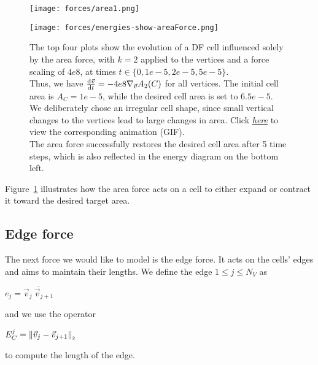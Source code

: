 \begin{figure}[htbp]
  \centering
  \texttt{[image: forces/area1.png]}\\[1ex]
  \begin{minipage}[c]{0.35\textwidth}
    \texttt{[image: forces/energies-show-areaForce.png]}
  \end{minipage}\hfill
  \begin{minipage}[c]{0.6\textwidth}
    \caption{
		The top four plots show the evolution of a DF cell influenced solely by the area force, with $k=2$ applied to the vertices and a force scaling of $4e8$, at times $t \in \{0, 1e-5, 2e-5, 5e-5\}$.\\
		Thus, we have $\frac{\mathrm{d} \vec{v}}{\mathrm{d} t} = - 4e8 \nabla_{\vec{v}} A_2(C)$ for all vertices.
		The initial cell area is $A_C = 1e-5$, while the desired cell area is set to $6.5e-5$.\\
		We deliberately chose an irregular cell shape, since small vertical changes to the vertices lead to large changes in area.
		Click \href{https://github.com/tivo476c/FlexibleCellModel/blob/master/figures/gifs/showForces/show-areaForce.gif}{\textit{here}} to view the corresponding animation (GIF).\\
		The area force successfully restores the desired cell area after 5 time steps, which is also reflected in the energy diagram on the bottom left.
    } 
	\label{fig:areaForce}
  \end{minipage}
\end{figure}


Figure~\ref{fig:areaForce} illustrates how the area force acts on a cell to either expand or contract it toward the desired target area.

    
\subsection{Edge force}
The next force we would like to model is the edge force. 
It acts on the cells' edges and aims to maintain their lengths.
We define the edge $1 \leq j \leq N_V$ as 
\begin{center}
	$
	e_j = \overline{\vec{v}_j \: \vec{v}_{j+1}}
	$
\end{center}
and we use the operator 
\begin{center}
	$
	E^j_C = \norm[\vec{v}_j - \vec{v}_{j+1}]
	$
\end{center}
to compute the length of the edge. 

